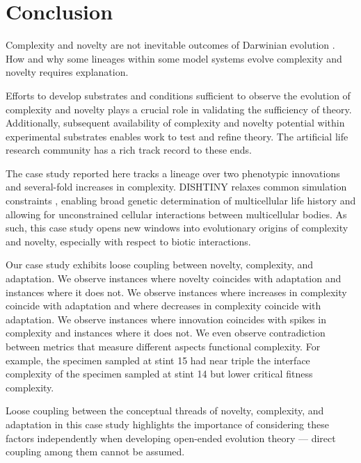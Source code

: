 \section{Conclusion}

Complexity and novelty are not inevitable outcomes of Darwinian evolution \citep{stanley2017open}.
How and why some lineages within some model systems evolve complexity and novelty requires explanation.

Efforts to develop substrates and conditions sufficient to observe the evolution of complexity and novelty plays a crucial role in validating the sufficiency of theory.
Additionally, subsequent availability of complexity and novelty potential within experimental substrates enables work to test and refine theory.
The artificial life research community has a rich track record to these ends.

The case study reported here tracks a lineage over two phenotypic innovations and several-fold increases in complexity.
DISHTINY relaxes common simulation constraints \citep{goldsby2012task, goldsby2014evolutionary}, enabling broad genetic determination of multicellular life history and allowing for unconstrained cellular interactions between multicellular bodies.
As such, this case study opens new windows into evolutionary origins of complexity and novelty, especially with respect to biotic interactions.

Our case study exhibits loose coupling between novelty, complexity, and adaptation.
We observe instances where novelty coincides with adaptation and instances where it does not.
We observe instances where increases in complexity coincide with adaptation and where decreases in complexity coincide with adaptation.
We observe instances where innovation coincides with spikes in complexity and instances where it does not.
We even observe contradiction between metrics that measure different aspects functional complexity.
For example, the specimen sampled at stint 15 had near triple the interface complexity of the specimen sampled at stint 14 but lower critical fitness complexity.

Loose coupling between the conceptual threads of novelty, complexity, and adaptation in this case study highlights the importance of considering these factors independently when developing open-ended evolution theory --- direct coupling among them cannot be assumed.


